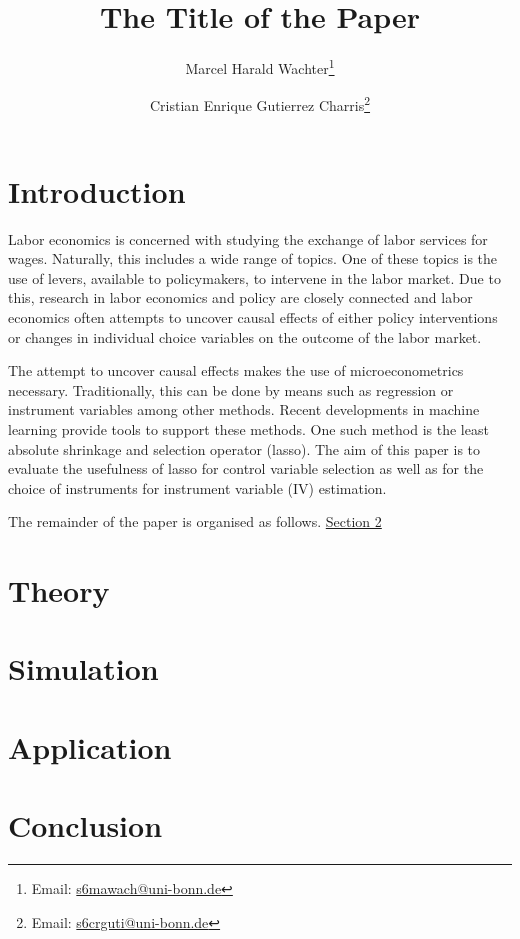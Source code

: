 \documentclass[a4paper,12pt]{article}
\author{Marcel Harald Wachter\thanks{Email: \href{mailto:s6mawach@uni-bonn.de}{s6mawach@uni-bonn.de}} \and Cristian Enrique Gutierrez Charris\thanks{Email: \href{mailto:s6crguti@uni-bonn.de}{s6crguti@uni-bonn.de}}}
\title{The Title of the Paper}
\begin{document}
\maketitle
\thispagestyle{empty}

\begin{singlespace}
\begin{abstract}

\end{abstract}
\end{singlespace}

\newpage
{}

\section{Introduction}
\label{sec:introduction}
Labor economics is concerned with studying the exchange of labor services for wages.
Naturally, this includes a wide range of topics.
One of these topics is the use of levers, available to policymakers, to intervene in the labor market.
Due to this, research in labor economics and policy are closely connected and labor economics often attempts to uncover causal effects of either policy interventions or changes in individual choice variables on the outcome of the labor market.

The attempt to uncover causal effects makes the use of microeconometrics necessary. Traditionally, this can be done by means such as regression or instrument variables among other methods. Recent developments in machine learning provide tools to support these methods. One such method is the least absolute shrinkage and selection operator (lasso). The aim of this paper is to evaluate the usefulness of lasso for control variable selection as well as for the choice of instruments for instrument variable (IV) estimation.

The remainder of the paper is organised as follows. \hyperref[sec:theory]{Section 2}


\section{Theory}
\label{sec:theory}

\section{Simulation}
\label{sec:simulation}

\section{Application}
\label{sec:application}

\section{Conclusion}
\label{sec:conclusion}
\end{document}

